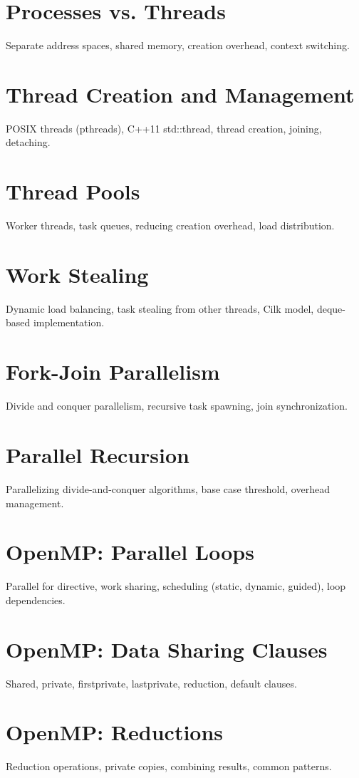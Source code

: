 \chapter{Processes vs. Threads}
Separate address spaces, shared memory, creation overhead, context switching.

\chapter{Thread Creation and Management}
POSIX threads (pthreads), C++11 std::thread, thread creation, joining, detaching.

\chapter{Thread Pools}
Worker threads, task queues, reducing creation overhead, load distribution.

\chapter{Work Stealing}
Dynamic load balancing, task stealing from other threads, Cilk model, deque-based implementation.

\chapter{Fork-Join Parallelism}
Divide and conquer parallelism, recursive task spawning, join synchronization.

\chapter{Parallel Recursion}
Parallelizing divide-and-conquer algorithms, base case threshold, overhead management.

\chapter{OpenMP: Parallel Loops}
Parallel for directive, work sharing, scheduling (static, dynamic, guided), loop dependencies.

\chapter{OpenMP: Data Sharing Clauses}
Shared, private, firstprivate, lastprivate, reduction, default clauses.

\chapter{OpenMP: Reductions}
Reduction operations, private copies, combining results, common patterns.

